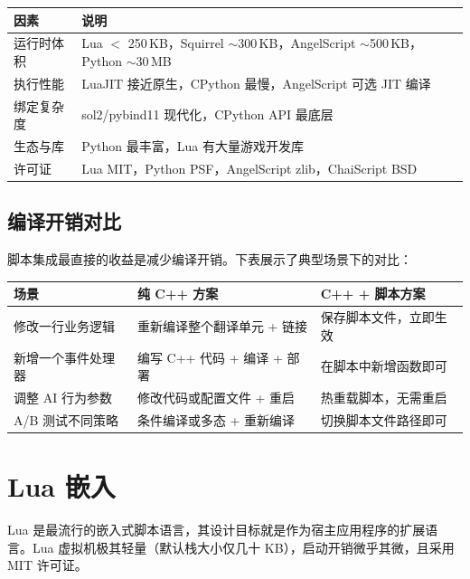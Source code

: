 \documentclass[12pt,a4paper,fontset=fandol]{ctexbook}
\newenvironment{guideline}[1][]{%
  \begin{tcolorbox}[enhanced,breakable,
    colback=blue!5!white,colframe=blue!75!black,
    boxed title style={colback=blue!75!black},
    attach boxed title to top left={yshift=-2mm,xshift=2mm},
    arc=2mm,boxrule=0.8mm,
    title={脚本集成要点},#1]}%
  {\end{tcolorbox}}
\begin{document}
\begin{guideline}[title={选型考量因素}]
\begin{tabularx}{\textwidth}{lX}
\toprule
\textbf{因素} & \textbf{说明} \\
\midrule
运行时体积 & Lua $<$ 250\,KB，Squirrel $\sim$300\,KB，AngelScript $\sim$500\,KB，Python $\sim$30\,MB \\
执行性能 & LuaJIT 接近原生，CPython 最慢，AngelScript 可选 JIT 编译 \\
绑定复杂度 & sol2/pybind11 现代化，CPython API 最底层 \\
生态与库 & Python 最丰富，Lua 有大量游戏开发库 \\
许可证 & Lua MIT，Python PSF，AngelScript zlib，ChaiScript BSD \\
\bottomrule
\end{tabularx}
\end{guideline}

\section{编译开销对比}\label{sec:compile-cost}

脚本集成最直接的收益是减少编译开销。下表展示了典型场景下的对比：

\begin{center}
\begin{tabularx}{\textwidth}{lXX}
\toprule
\textbf{场景} & \textbf{纯 C++ 方案} & \textbf{C++ + 脚本方案} \\
\midrule
修改一行业务逻辑 & 重新编译整个翻译单元 + 链接 & 保存脚本文件，立即生效 \\
新增一个事件处理器 & 编写 C++ 代码 + 编译 + 部署 & 在脚本中新增函数即可 \\
调整 AI 行为参数 & 修改代码或配置文件 + 重启 & 热重载脚本，无需重启 \\
A/B 测试不同策略 & 条件编译或多态 + 重新编译 & 切换脚本文件路径即可 \\
\bottomrule
\end{tabularx}
\end{center}


\chapter{Lua 嵌入}\label{ch:lua}

Lua 是最流行的嵌入式脚本语言，其设计目标就是作为宿主应用程序的扩展语言。Lua 虚拟机极其轻量（默认栈大小仅几十 KB），启动开销微乎其微，且采用 MIT 许可证。
\end{document}
